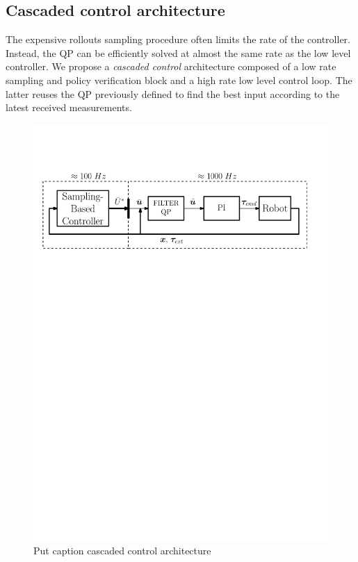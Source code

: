 \subsection{Cascaded control architecture}
The expensive rollouts sampling procedure often limits the rate of the controller. Instead, the QP can be efficiently solved at almost the same rate as the low level controller. We propose a \emph{cascaded control} architecture composed of a low rate sampling and policy verification block and a high rate low level control loop. The latter reuses the QP previously defined to find the best input according to the latest received measurements. 
\begin{figure}[t!]
\centering
\hspace*{-1.0cm}
\includegraphics[width=1.1\columnwidth]{figures/schemes/high_level_architecture.pdf}
\caption{Put caption cascaded control architecture} \label{fig:cascaded_architecture}
\end{figure}

